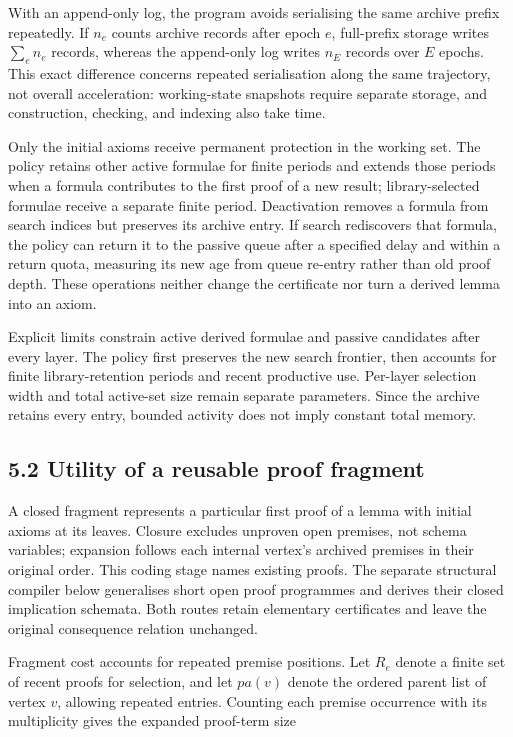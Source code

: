 \documentclass[pdflatex,sn-basic,Numbered]{sn-jnl}
\begin{document}
With an append-only log, the program avoids serialising the same archive prefix repeatedly. If \(n_{e}\) counts archive records after epoch \(e\), full-prefix storage writes \(\sum_{e}^{}n_{e}\) records, whereas the append-only log writes \(n_{E}\) records over \(E\) epochs. This exact difference concerns repeated serialisation along the same trajectory, not overall acceleration: working-state snapshots require separate storage, and construction, checking, and indexing also take time.

Only the initial axioms receive permanent protection in the working set. The policy retains other active formulae for finite periods and extends those periods when a formula contributes to the first proof of a new result; library-selected formulae receive a separate finite period. Deactivation removes a formula from search indices but preserves its archive entry. If search rediscovers that formula, the policy can return it to the passive queue after a specified delay and within a return quota, measuring its new age from queue re-entry rather than old proof depth. These operations neither change the certificate nor turn a derived lemma into an axiom.

Explicit limits constrain active derived formulae and passive candidates after every layer. The policy first preserves the new search frontier, then accounts for finite library-retention periods and recent productive use. Per-layer selection width and total active-set size remain separate parameters. Since the archive retains every entry, bounded activity does not imply constant total memory.

\subsection*{5.2 Utility of a reusable proof fragment}\label{utility-of-a-reusable-proof-fragment}

A closed fragment represents a particular first proof of a lemma with initial axioms at its leaves. Closure excludes unproven open premises, not schema variables; expansion follows each internal vertex's archived premises in their original order. This coding stage names existing proofs. The separate structural compiler below generalises short open proof programmes and derives their closed implication schemata. Both routes retain elementary certificates and leave the original consequence relation unchanged.

Fragment cost accounts for repeated premise positions. Let \(R_{e}\) denote a finite set of recent proofs for selection, and let \(pa(v)\) denote the ordered parent list of vertex \(v\), allowing repeated entries. Counting each premise occurrence with its multiplicity gives the expanded proof-term size
\end{document}
